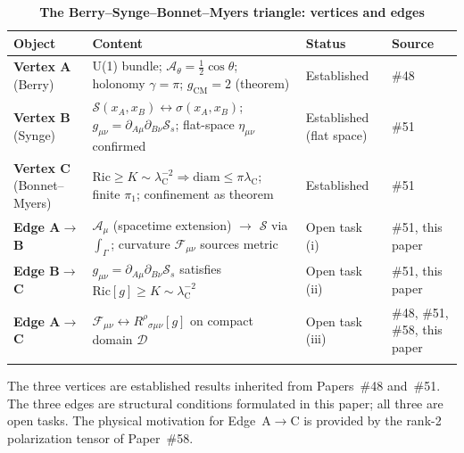 \documentclass[%
 reprint, amsmath,amssymb, aps, prd, ]{revtex4-2}
\numberwithin{equation}{section}
\newcommand{\lambdaC}{\lambda_{\mathrm{C}}}
\newcommand{\BerryA}{\mathcal{A}}
\newcommand{\BerryF}{\mathcal{F}}
\newcommand{\SyngeS}{\mathcal{S}}
\begin{document}
\begin{table}[t!]
\centering
\caption{\textbf{The Berry--Synge--Bonnet--Myers triangle: vertices and edges}}
\label{tab:triangle}
\renewcommand{\arraystretch}{1.4}
\begin{tabular}{p{2.8cm}p{5.0cm}p{4.0cm}p{3.7cm}}
\toprule
\textbf{Object} & \textbf{Content} & \textbf{Status} & \textbf{Source} \\
\midrule
\textbf{Vertex A} (Berry)
& U(1) bundle; $\BerryA_\theta = \tfrac{1}{2}\cos\theta$; holonomy $\gamma = \pi$; $g_\mathrm{CM} = 2$ (theorem)
& Established
& \#48 \\
\addlinespace[0.3cm]
\textbf{Vertex B} (Synge)
& $\SyngeS(x_A,x_B) \leftrightarrow \sigma(x_A,x_B)$; $g_{\mu\nu} = \partial_{A\mu}\partial_{B\nu}\SyngeS_s$; flat-space $\eta_{\mu\nu}$ confirmed
& Established (flat space)
& \#51 \\
\addlinespace[0.3cm]
\textbf{Vertex C} (Bonnet--Myers)
& $\mathrm{Ric} \geq K \sim \lambdaC^{-2} \Rightarrow \mathrm{diam} \leq \pi\lambdaC$; finite $\pi_1$; confinement as theorem
& Established
& \#51 \\
\addlinespace[0.3cm]
\textbf{Edge A$\to$B}
& $\BerryA_\mu$ (spacetime extension) $\to$ $\SyngeS$ via $\int_\Gamma$; curvature $\BerryF_{\mu\nu}$ sources metric
& Open task (i)
& \#51, this paper \\
\addlinespace[0.3cm]
\textbf{Edge B$\to$C}
& $g_{\mu\nu} = \partial_{A\mu}\partial_{B\nu}\SyngeS_s$ satisfies $\mathrm{Ric}[g] \geq K \sim \lambdaC^{-2}$
& Open task (ii)
& \#51, this paper \\
\addlinespace[0.3cm]
\textbf{Edge A$\to$C}
& $\BerryF_{\mu\nu} \leftrightarrow R^\rho{}_{\sigma\mu\nu}[g]$ on compact domain $\mathcal{D}$
& Open task (iii)
& \#48, \#51, \#58, this paper \\
\addlinespace[0.2cm]
\bottomrule
\end{tabular}
\vspace{0.2cm}
\begin{minipage}{0.95\textwidth}
\justifying\footnotesize
The three vertices are established results inherited from Papers~\#48 and~\#51. The three edges are structural conditions formulated in this paper; all three are open tasks. The physical motivation for Edge~A$\to$C is provided by the rank-2 polarization tensor of Paper~\#58.
\end{minipage}
\end{table}
\end{document}
